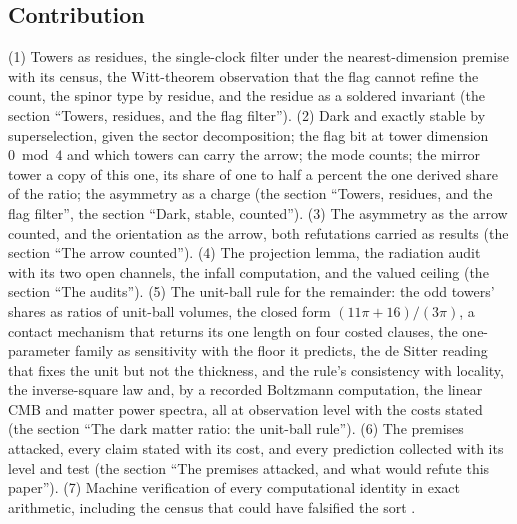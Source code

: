 \documentclass[11pt]{article}
\theoremstyle{definition}
\theoremstyle{plain}
\begin{document}
\subsection*{Contribution}
\label{c:note.dark-matter.setting-contribution}
(1) Towers as residues, the single-clock filter under the nearest-dimension premise with its census, the Witt-theorem observation that the flag cannot refine the count, the spinor type by residue, and the residue as a soldered invariant (the section ``Towers, residues, and the flag filter''). (2) Dark and exactly stable by superselection, given the sector decomposition; the flag bit at tower dimension $0 \bmod 4$ and which towers can carry the arrow; the mode counts; the mirror tower a copy of this one, its share of one to half a percent the one derived share of the ratio; the asymmetry as a charge (the section ``Towers, residues, and the flag filter'', the section ``Dark, stable, counted''). (3) The asymmetry as the arrow counted, and the orientation as the arrow, both refutations carried as results (the section ``The arrow counted''). (4) The projection lemma, the radiation audit with its two open channels, the infall computation, and the valued ceiling (the section ``The audits''). (5) The unit-ball rule for the remainder: the odd towers' shares as ratios of unit-ball volumes, the closed form $(11\pi + 16)/(3\pi)$, a contact mechanism that returns its one length on four costed clauses, the one-parameter family as sensitivity with the floor it predicts, the de Sitter reading that fixes the unit but not the thickness, and the rule's consistency with locality, the inverse-square law and, by a recorded Boltzmann computation, the linear CMB and matter power spectra, all at observation level with the costs stated (the section ``The dark matter ratio: the unit-ball rule''). (6) The premises attacked, every claim stated with its cost, and every prediction collected with its level and test (the section ``The premises attacked, and what would refute this paper''). (7) Machine verification of every computational identity in exact arithmetic, including the census that could have falsified the sort \cite{ButlerVerifyT14}.
\end{document}

